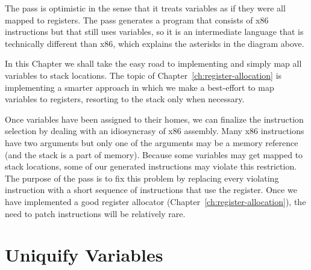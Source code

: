 \documentclass[11pt]{book}
\begin{document}
The  pass is optimistic in the sense that it
treats variables as if they were all mapped to registers. The
 pass generates a program that consists of
x86 instructions but that still uses variables, so it is an
intermediate language that is technically different than x86, which
explains the asterisks in the diagram above.

In this Chapter we shall take the easy road to implementing
 and simply map all variables to stack locations.
The topic of Chapter~\ref{ch:register-allocation} is implementing a
smarter approach in which we make a best-effort to map variables to
registers, resorting to the stack only when necessary.



Once variables have been assigned to their homes, we can finalize the
instruction selection by dealing with an idiosyncrasy of x86
assembly. Many x86 instructions have two arguments but only one of the
arguments may be a memory reference (and the stack is a part of
memory).  Because some variables may get mapped to stack locations,
some of our generated instructions may violate this restriction.  The
purpose of the  pass is to fix this problem by
replacing every violating instruction with a short sequence of
instructions that use the  register. Once we have implemented
a good register allocator (Chapter~\ref{ch:register-allocation}), the
need to patch instructions will be relatively rare.


\section{Uniquify Variables}
\label{sec:uniquify-s0}
\end{document}
